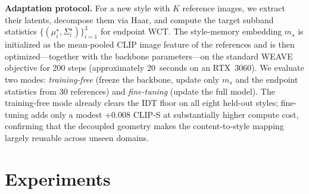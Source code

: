 \documentclass[letterpaper]{article}
\begin{document}
\textbf{Adaptation protocol.}
For a new style with $K$ reference images, we extract their latents, decompose them via Haar, and compute the target subband statistics $\{(\mu_i^\star,\Sigma_i^\star)\}_{i=1}^3$ for endpoint WCT.
The style-memory embedding $m_s$ is initialized as the mean-pooled CLIP image feature of the references and is then optimized---together with the backbone parameters---on the standard WEAVE objective for 200 steps (approximately 20~seconds on an RTX~3060).
We evaluate two modes: \emph{training-free} (freeze the backbone, update only $m_s$ and the endpoint statistics from 30 references) and \emph{fine-tuning} (update the full model).
The training-free mode already clears the IDT floor on all eight held-out styles; fine-tuning adds only a modest $+0.008$ CLIP-S at substantially higher compute cost, confirming that the decoupled geometry makes the content-to-style mapping largely reusable across unseen domains.










\section{Experiments}
\label{sec:exp}
\end{document}
